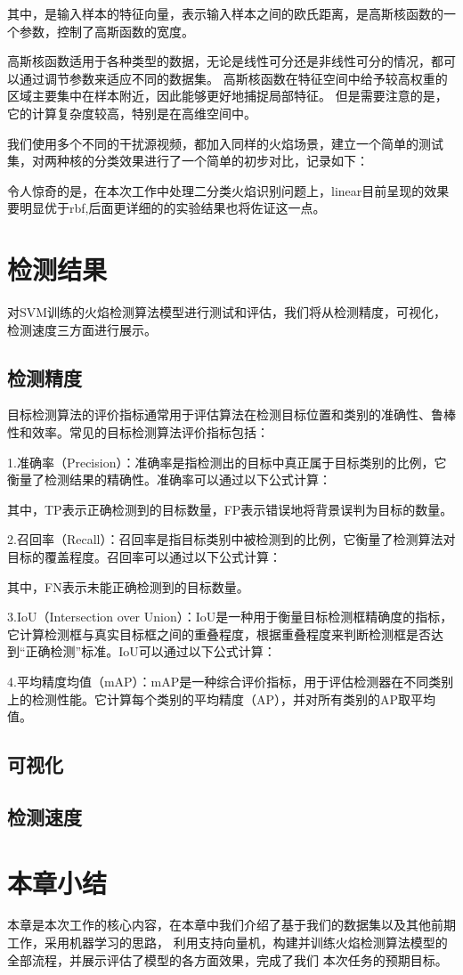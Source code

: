 其中，是输入样本的特征向量，表示输入样本之间的欧氏距离，是高斯核函数的一个参数，控制了高斯函数的宽度。

高斯核函数适用于各种类型的数据，无论是线性可分还是非线性可分的情况，都可以通过调节参数来适应不同的数据集。
高斯核函数在特征空间中给予较高权重的区域主要集中在样本附近，因此能够更好地捕捉局部特征。
但是需要注意的是，它的计算复杂度较高，特别是在高维空间中。

我们使用多个不同的干扰源视频，都加入同样的火焰场景，建立一个简单的测试集，对两种核的分类效果进行了一个简单的初步对比，记录如下：

令人惊奇的是，在本次工作中处理二分类火焰识别问题上，linear目前呈现的效果要明显优于rbf,后面更详细的的实验结果也将佐证这一点。
\section{检测结果}
对SVM训练的火焰检测算法模型进行测试和评估，我们将从检测精度，可视化，检测速度三方面进行展示。
\subsection{检测精度}
目标检测算法的评价指标通常用于评估算法在检测目标位置和类别的准确性、鲁棒性和效率。常见的目标检测算法评价指标包括：

1.准确率（Precision）：准确率是指检测出的目标中真正属于目标类别的比例，它衡量了检测结果的精确性。准确率可以通过以下公式计算：

其中，TP表示正确检测到的目标数量，FP表示错误地将背景误判为目标的数量。

2.召回率（Recall）：召回率是指目标类别中被检测到的比例，它衡量了检测算法对目标的覆盖程度。召回率可以通过以下公式计算：

其中，FN表示未能正确检测到的目标数量。

3.IoU（Intersection over Union）：IoU是一种用于衡量目标检测框精确度的指标，它计算检测框与真实目标框之间的重叠程度，根据重叠程度来判断检测框是否达到“正确检测”标准。IoU可以通过以下公式计算：


4.平均精度均值（mAP）：mAP是一种综合评价指标，用于评估检测器在不同类别上的检测性能。它计算每个类别的平均精度（AP），并对所有类别的AP取平均值。


\subsection{可视化}
\subsection{检测速度}

\section{本章小结}
本章是本次工作的核心内容，在本章中我们介绍了基于我们的数据集以及其他前期工作，采用机器学习的思路，
利用支持向量机，构建并训练火焰检测算法模型的全部流程，并展示评估了模型的各方面效果，完成了我们
本次任务的预期目标。